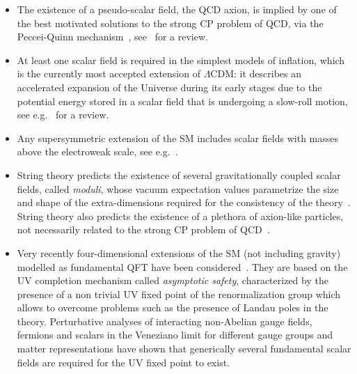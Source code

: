 \documentclass[11pt,a4paper]{article}
\begin{document}
\begin{itemize}

\item{} The existence of a pseudo-scalar field, the QCD axion, is implied by one of the best motivated solutions to the strong CP problem of QCD, via the Peccei-Quinn mechanism~\cite{Peccei:1977hh}, see~\cite{Marsh:2015xka} for a review. 

\item{} At least one scalar field is required in the simplest models of inflation, which is the currently most accepted extension of $\Lambda$CDM: it describes an accelerated expansion of the Universe during its early stages due to the potential energy stored in a scalar field that is undergoing a slow-roll motion, see e.g.~\cite{Baumann:2009ds} for a review. 

\item{} Any supersymmetric extension of the SM includes scalar fields with masses above the electroweak scale, see e.g.~\cite{Martin:1997ns, Weinberg:2000cr}. 

\item{} String theory predicts the existence of several gravitationally coupled scalar fields, called \textit{moduli}, whose vacuum expectation values parametrize the size and shape of the extra-dimensions required for the consistency of the theory~\cite{Ibanez:2012zz}. String theory also predicts the existence of a plethora of axion-like particles, not necessarily related to the strong CP problem of QCD~\cite{Arvanitaki:2009fg, Cicoli:2012sz}.

\item Very recently four-dimensional extensions of the SM (not including gravity) modelled as fundamental QFT have been considered~\cite{Litim:2014uca}. They are based on the UV completion mechanism called \textit{asymptotic safety}, characterized by the presence of a non trivial UV fixed point of the renormalization group which allows to overcome problems such as the presence of Landau poles in the theory. Perturbative analyses of interacting non-Abelian gauge fields, fermions and scalars in the Veneziano limit for different gauge groups and matter representations have shown that generically several fundamental scalar fields are required for the UV fixed point to exist.
\end{itemize}
\end{document}
